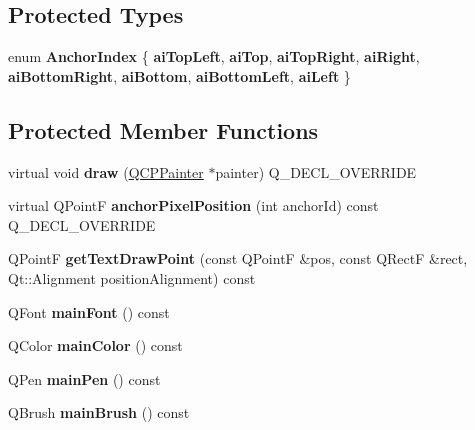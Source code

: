 \subsection*{Protected Types}
\begin{DoxyCompactItemize}
\item 
\mbox{\label{class_q_c_p_item_text_a14a84e58f72519c8ae1d7a4a1dd23f21}} 
enum {\bfseries Anchor\+Index} \{ \newline
{\bfseries ai\+Top\+Left}, 
{\bfseries ai\+Top}, 
{\bfseries ai\+Top\+Right}, 
{\bfseries ai\+Right}, 
\newline
{\bfseries ai\+Bottom\+Right}, 
{\bfseries ai\+Bottom}, 
{\bfseries ai\+Bottom\+Left}, 
{\bfseries ai\+Left}
 \}
\end{DoxyCompactItemize}
\subsection*{Protected Member Functions}
\begin{DoxyCompactItemize}
\item 
\mbox{\label{class_q_c_p_item_text_a8f8f075da83b6547c2b32e1f64cf0554}} 
virtual void {\bfseries draw} (\hyperlink{class_q_c_p_painter}{Q\+C\+P\+Painter} $\ast$painter) Q\+\_\+\+D\+E\+C\+L\+\_\+\+O\+V\+E\+R\+R\+I\+DE
\item 
\mbox{\label{class_q_c_p_item_text_afcdb1724d88d561f65da95fb54b0acb7}} 
virtual Q\+PointF {\bfseries anchor\+Pixel\+Position} (int anchor\+Id) const Q\+\_\+\+D\+E\+C\+L\+\_\+\+O\+V\+E\+R\+R\+I\+DE
\item 
\mbox{\label{class_q_c_p_item_text_a4c76ad7e33c50aff0a60b8f38fe6060e}} 
Q\+PointF {\bfseries get\+Text\+Draw\+Point} (const Q\+PointF \&pos, const Q\+RectF \&rect, Qt\+::\+Alignment position\+Alignment) const
\item 
\mbox{\label{class_q_c_p_item_text_af30ac2a0b84afa86a1dec22ab48dd07d}} 
Q\+Font {\bfseries main\+Font} () const
\item 
\mbox{\label{class_q_c_p_item_text_abe3f10805baf62797cb91fd4a4464fcc}} 
Q\+Color {\bfseries main\+Color} () const
\item 
\mbox{\label{class_q_c_p_item_text_a2f67fcbb7ac10ea9a94c4ecc3b0f4dfc}} 
Q\+Pen {\bfseries main\+Pen} () const
\item 
\mbox{\label{class_q_c_p_item_text_acddddd3ce88cfc87ab57b1ec4b25acb9}} 
Q\+Brush {\bfseries main\+Brush} () const
\end{DoxyCompactItemize}

